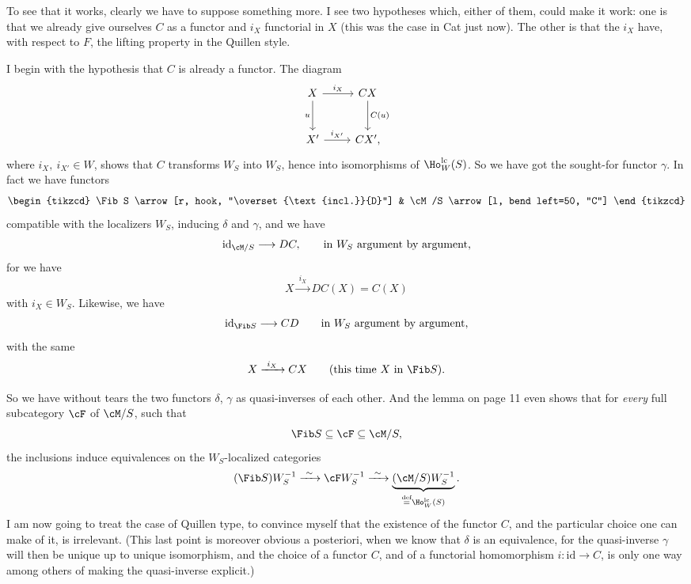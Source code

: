 To see that it works, clearly we have to suppose something more. I see two
hypotheses which, either of them, could make it work: one is that we already give ourselves
$C$ as a functor and $i_X$ functorial in $X$ (this was the case in Cat just now).
The other is that
the $i_X$ have, with respect to $F$, the lifting property in the Quillen style. %

I begin with the hypothesis that $C$ is already a functor. The diagram
\[
\begin{tikzcd}[row sep=large]
X \arrow[r, "i_X"] \arrow[d, "u"'] & CX \arrow[d, "C(u)"] \\
X' \arrow[r, "i_{X'}"] & CX',
\end{tikzcd}
\]
where $i_X,\ i_{X'}\in W$, shows that $C$ transforms $W_S$ into $W_S$, hence into isomorphisms of
$\Ho^{\mathrm{lc}}_W(S)$. So we have got the sought-for functor $\gamma$. In fact we have functors
\[
\begin{tikzcd}
\Fib S \arrow[r, hook, "\overset{\text{incl.}}{D}"] & \cM/S \arrow[l, bend left=50, "C"]
\end{tikzcd}
\]
compatible with the localizers $W_S$, inducing $\delta$ and $\gamma$, and we have
\[
\mathrm{id}_{\cM/S}\longrightarrow DC, \qquad \text{in $W_S$ argument by argument,}
\]
for we have
\[
X\xrightarrow{\ i_X\ }DC(X)=C(X)
\]
with $i_X\in W_S$. Likewise, we have
\[
\mathrm{id}_{\Fib S}\longrightarrow CD \qquad \text{in $W_S$ argument by argument,}
\]
with the same
\[
X\xrightarrow{\ i_X\ }CX \qquad \text{(this time $X$ in $\Fib S$).}
\]

So we have without tears the two functors $\delta$, $\gamma$ as quasi-inverses of each other. And the
lemma on page 11 even shows that for \textit{every} full subcategory $\cF$ of $\cM/S$, such that
\[
\Fib S\subseteq\cF\subseteq\cM/S,
\]
the inclusions induce equivalences on the $W_S$-localized categories
\[
(\Fib S)W_S^{-1}\xrightarrow{\ \sim\ }\cF W_S^{-1}\xrightarrow{\ \sim\ }\underbrace{(\cM/S)W_S^{-1}}_{\overset{\text{def}}{=}\Ho^{\mathrm{lc}}_W(S)}.
\]
I am now going to treat the case of Quillen type, to convince myself that the existence of the
functor $C$, and the particular choice one can make of it, is irrelevant. (This last point
is moreover obvious a posteriori, when we know that $\delta$ is an equivalence, for the quasi-inverse
$\gamma$ will then be unique up to unique isomorphism, and the choice of a functor $C$, and
of a functorial homomorphism $i:\mathrm{id}\longrightarrow C$, is only one way among others of making
the quasi-inverse explicit.)

